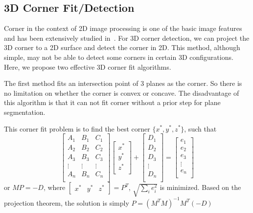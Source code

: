 \documentclass[twocolumn]{IEEEtran}
\begin{document}
\subsection{3D Corner Fit/Detection}
\label{sec3_3dcornerfit}

Corner in the context of 2D image processing is one of the basic image features and has been extensively studied in~\cite{Ruzon99Corner,Smith97Susan}. For 3D corner detection, we can project the 3D corner to a 2D surface and detect the corner in 2D. This method, although simple, may not be able to detect some corners in certain 3D configurations. Here, we propose two effective 3D corner fit algorithms. 

The first method fits an intersection point of 3 planes as the corner. So there is no limitation on whether the corner is convex or concave. The disadvantage of this algorithm  is that it can not fit corner without a prior step for plane segmentation. 

This corner fit problem is to find the best corner $\{x^*,y^*,z^*\}$, such that
$$\begin{bmatrix}
    A_1 & B_1 & C_1 \\
    A_2 & B_2 & C_2 \\
    A_3 & B_3 & C_3 \\
    \vdots & \vdots& \vdots \\
    A_n & B_n & C_n \\
    \end{bmatrix}
    \begin{bmatrix}
    x^* \\ y^* \\ z^* \\ 
    \end{bmatrix}
+
    \begin{bmatrix}
    D_1 \\ D_2 \\ D_3 \\ \vdots \\ D_n \\
    \end{bmatrix}
=
    \begin{bmatrix}
    e_1 \\ e_2 \\ e_3 \\ \vdots \\ e_n \\
    \end{bmatrix}
$$
or $M P = -D$, where $\begin{bmatrix} x^* & y^* & z^*  \end{bmatrix} = P^T$,  $\sqrt{\sum_i  e_i^2}$ is minimized. Based on the projection theorem, the solution is simply $P =(M^T M)^{-1} M^T (-D)$
\end{document}
